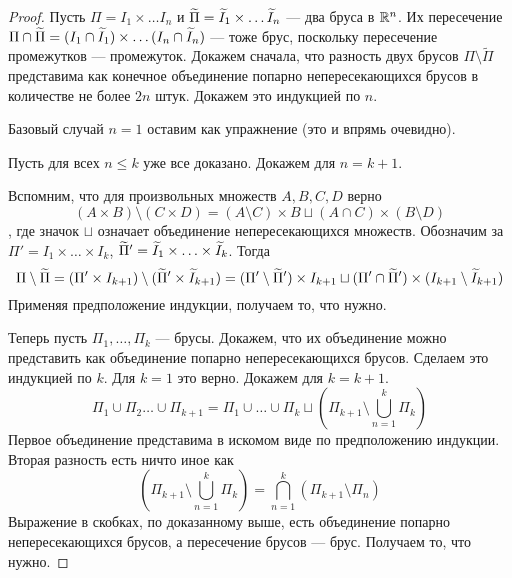 	\begin{proof}
		Пусть $\Pi = I_1 \times \ldots I_n$ и $\widetilde{\Pi} = \widetilde{I}_1 \times \ldots \widetilde{I}_n$ --- два бруса в $\mathbb{R}^n$. Их пересечение $\Pi \cap \widetilde{\Pi} = (I_1 \cap \widetilde{I}_1) \times \ldots (I_n\cap \widetilde{I}_n)$ --- тоже брус, поскольку пересечение промежутков --- промежуток.
		Докажем сначала, что разность двух брусов $\Pi \setminus \widetilde{\Pi}$ представима как конечное объединение попарно непересекающихся брусов в количестве не более $2n$ штук. Докажем это индукцией по $n$.
		\par Базовый случай $n=1$ оставим как упражнение (это и впрямь очевидно).
		\par Пусть для всех $n \leqslant k$ уже все доказано. Докажем для $n = k + 1$. 
		\par Вспомним, что для произвольных множеств $A, B, C, D$ верно
		$$
			(A\times B) \setminus (C \times D) = (A \setminus C) \times B \sqcup (A\cap C)\times (B \setminus D)
		$$
		, где значок $\sqcup$ означает объединение непересекающихся множеств.
		Обозначим за $\Pi' = I_1 \times \ldots \times I_k$, $\widetilde{\Pi}' = \widetilde{I}_1 \times \ldots \times \widetilde{I}_k$. Тогда
		$$
			\Pi \setminus \widetilde{\Pi} = (\Pi' \times I_{k+1}) \setminus (\widetilde{\Pi}' \times \widetilde{I}_{k + 1}) = (\Pi' \setminus \widetilde{\Pi}')\times I_{k + 1} \sqcup (\Pi' \cap \widetilde{\Pi}')\times (I_{k + 1} \setminus \widetilde{I}_{k + 1})
		$$
		Применяя предположение индукции, получаем то, что нужно.
		\par Теперь пусть $\Pi_1, \ldots, \Pi_k$ --- брусы. Докажем, что их объединение можно представить как объединение попарно непересекающихся брусов. Сделаем это индукцией по $k$. Для $k = 1$ это верно. Докажем для $k = k + 1$.
		$$
			\Pi_1 \cup \Pi_2 \ldots \cup \Pi_{k + 1} = \Pi_1 \cup \ldots \cup \Pi_{k} \sqcup \left(\Pi_{k + 1} \setminus \bigcup\limits_{n =1}^k\Pi_k\right)
		$$
		Первое объединение представима в искомом виде по предположению индукции. Вторая разность есть ничто иное как
		$$
			\left(\Pi_{k + 1} \setminus \bigcup\limits_{n =1}^k\Pi_k\right) = \bigcap\limits_{n=1}^{k}(\Pi_{k + 1} \setminus \Pi_n)
		$$
		Выражение в скобках, по доказанному выше, есть объединение попарно непересекающихся брусов, а пересечение брусов --- брус. Получаем то, что нужно.
	\end{proof}